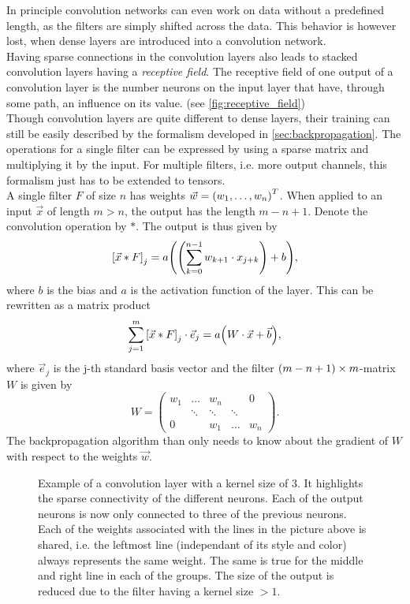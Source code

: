 In principle convolution networks can even work on data without a predefined length, as the filters are simply shifted across the data. This behavior is however lost, when dense layers are introduced into a convolution network.\medskip\\
Having sparse connections in the convolution layers also leads to stacked convolution layers having a \emph{receptive field}. The receptive field of one output of a convolution layer is the number neurons on the input layer that have, through some path, an influence on its value. (see \autoref{fig:receptive_field})\medskip\\
Though convolution layers are quite different to dense layers, their training can still be easily described by the formalism developed in \autoref{sec:backpropagation}. The operations for a single filter can be expressed by using a sparse matrix and multiplying it by the input. For multiple filters, i.e. more output channels, this formalism just has to be extended to tensors.\\
A single filter $F$ of size $n$ has weights $\vec{w} = {\left( w_1, \dotsc, w_n \right)}^T$. When applied to an input $\vec{x}$ of length $m>n$, the output has the length $m - n + 1$. Denote the convolution operation by $\ast$. The output is thus given by
\begin{equation}
{\left[\vec{x}\ast F\right]}_j = a{\left( {\left( \sum_{k=0}^{n-1} w_{k+1}\cdot x_{j+k} \right)}+b \right)},
\end{equation}
where $b$ is the bias and $a$ is the activation function of the layer. This can be rewritten as a matrix product
\begin{equation}
\sum_{j=1}^m {\left[\vec{x}\ast F\right]}_j \cdot\vec{e}_j = a{\left( W\cdot \vec{x}+\vec{b} \right)},
\end{equation}
where $\vec{e}_j$ is the j-th standard basis vector and the filter ${\left( m-n+1 \right)}\times m$-matrix $W$ is given by
\begin{equation}
W =
\begin{pmatrix}
	w_1 & \dots & w_n & {} & 0 \\
	{} & \ddots & \ddots & \ddots & {}\\
	0 & {} & w_1 & \dots & w_n
\end{pmatrix}.
\end{equation}
The backpropagation algorithm than only needs to know about the gradient of $W$ with respect to the weights $\vec{w}$.
\begin{figure}
\centering

\caption[Convolution 1D]{Example of a convolution layer with a kernel size of $3$. It highlights the sparse connectivity of the different neurons. Each of the output neurons is now only connected to three of the previous neurons. Each of the weights associated with the lines in the picture above is shared, i.e. the leftmost line (independant of its style and color) always represents the same weight. The same is true for the middle and right line in each of the groups. The size of the output is reduced due to the filter having a kernel size $>1$.}\label{fig:simple_convolution}
\end{figure}
